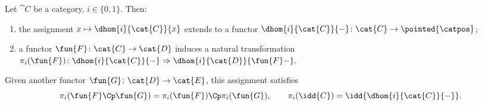     \begingroup
    \def\theproposition{\ref{prop: Homotopy posets are functorial}}
    \begin{proposition}
        Let $\cat{C}$ be a category, $i \in \{0, 1\}$.
        Then:
        \begin{enumerate}
            \item the assignment $x \mapsto \dhom{i}{\cat{C}}{x}$ extends to a functor
                $\dhom{i}{\cat{C}}{-}\colon \cat{C} \to \pointed{\catpos}$;
            \item a functor $\fun{F}\colon \cat{C} \to \cat{D}$ induces a natural transformation 
                $\pi_i(\fun{F})\colon \dhom{i}{\cat{C}}{-} \Rightarrow \dhom{i}{\cat{D}}{\fun{F}-}.$
        \end{enumerate}
        Given another functor $\fun{G}\colon \cat{D} \to \cat{E}$,  this assignment satisfies
        \begin{equation*}
            \pi_i(\fun{F}\Cp \fun{G}) = \pi_i(\fun{F}) \Cp \pi_i(\fun{G}), \quad \quad \pi_i(\idd{C}) = \idd{\dhom{i}{\cat{C}}{-}}.
        \end{equation*}
    \end{proposition}
    \addtocounter{proposition}{-1}
    \endgroup
